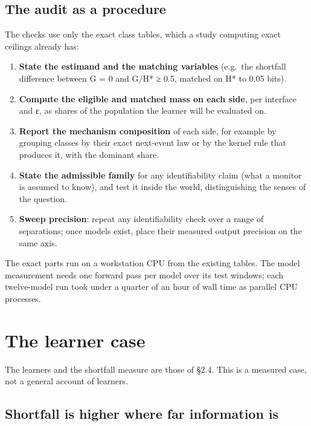 \documentclass[10pt]{article}
\providecommand{\tightlist}{\setlength{\itemsep}{0pt}\setlength{\parskip}{0pt}}
\begin{document}
\hypertarget{the-audit-as-a-procedure}{%
\subsection{The audit as a procedure}\label{the-audit-as-a-procedure}}

The checks use only the exact class tables, which a study computing exact ceilings already has:

\begin{enumerate}
\def\labelenumi{\arabic{enumi}.}
\tightlist
\item
  \textbf{State the estimand and the matching variables} (e.g.~the shortfall difference between G = 0 and G/H* ≥ 0.5,
  matched on H* to 0.05 bits).
\item
  \textbf{Compute the eligible and matched mass on each side}, per interface and ε, as shares of the population the learner
  will be evaluated on.
\item
  \textbf{Report the mechanism composition} of each side, for example by grouping classes by their exact next-event law or by
  the kernel rule that produces it, with the dominant share.
\item
  \textbf{State the admissible family} for any identifiability claim (what a monitor is assumed to know), and test it inside
  the world, distinguishing the senses of the question.
\item
  \textbf{Sweep precision}: repeat any identifiability check over a range of separations; once models exist, place their
  measured output precision on the same axis.
\end{enumerate}

The exact parts run on a workstation CPU from the existing tables. The model measurement needs one forward pass per
model over its test windows; each twelve-model run took under a quarter of an hour of wall time as parallel CPU
processes.

\hypertarget{the-learner-case}{%
\section{The learner case}\label{the-learner-case}}

The learners and the shortfall measure are those of §2.4. This is a measured case, not a general account of learners.

\hypertarget{shortfall-is-higher-where-far-information-is}{%
\subsection{Shortfall is higher where far information is}\label{shortfall-is-higher-where-far-information-is}}
\end{document}
